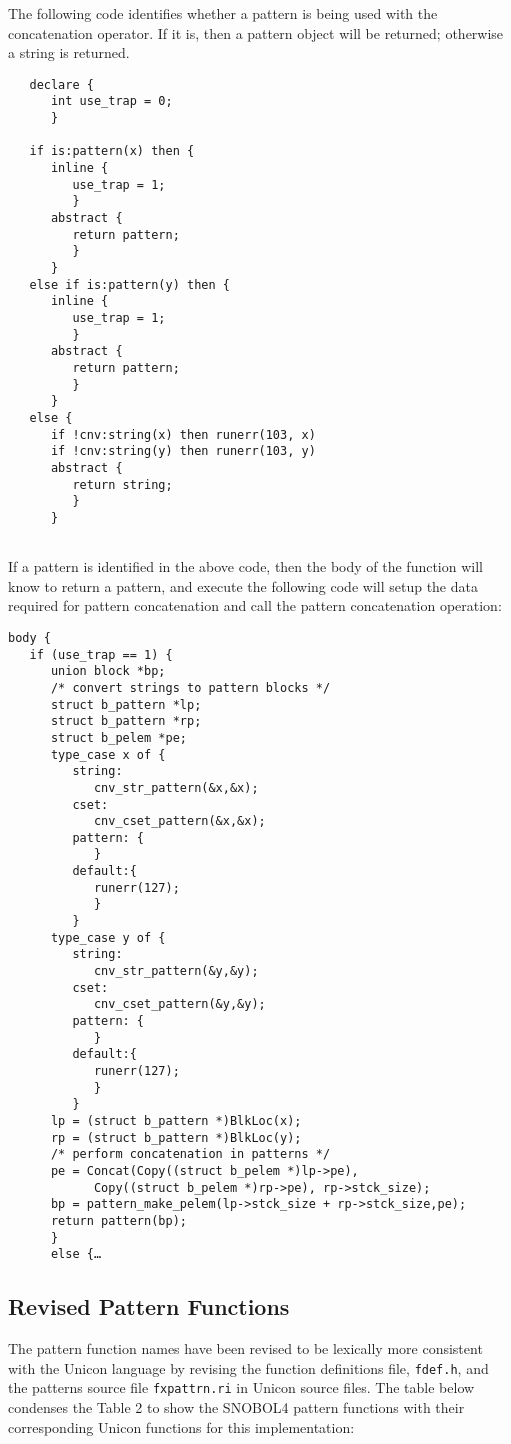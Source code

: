 \documentclass{article}
\begin{document}
The following code identifies whether a pattern is being used with the concatenation operator.  If it is, then a pattern object will be returned; otherwise a string is returned.
\begin{verbatim}
   declare {
      int use_trap = 0;
      }

   if is:pattern(x) then {
      inline {
         use_trap = 1;
         }
      abstract {
         return pattern;
         }
      }
   else if is:pattern(y) then {
      inline {
         use_trap = 1;
         }
      abstract {
         return pattern;
         }
      }
   else {
      if !cnv:string(x) then runerr(103, x)
      if !cnv:string(y) then runerr(103, y)
      abstract {
         return string;
         }
      }
      
\end{verbatim}
If a pattern is identified in the above code, then the body of the function will know to return a pattern, and execute the following code will setup the data required for pattern concatenation and call the pattern concatenation operation:
\begin{verbatim}
body {
   if (use_trap == 1) {
      union block *bp;
      /* convert strings to pattern blocks */
      struct b_pattern *lp;
      struct b_pattern *rp;
      struct b_pelem *pe;
      type_case x of {
         string:
            cnv_str_pattern(&x,&x);
         cset:
            cnv_cset_pattern(&x,&x);
         pattern: {
            }
         default:{
            runerr(127);
            }
         }
      type_case y of {
         string:
            cnv_str_pattern(&y,&y);
         cset:
			cnv_cset_pattern(&y,&y);
         pattern: {
            }
         default:{
            runerr(127);
            }
         }
      lp = (struct b_pattern *)BlkLoc(x);
      rp = (struct b_pattern *)BlkLoc(y);
      /* perform concatenation in patterns */
      pe = Concat(Copy((struct b_pelem *)lp->pe), 
            Copy((struct b_pelem *)rp->pe), rp->stck_size);
      bp = pattern_make_pelem(lp->stck_size + rp->stck_size,pe);
      return pattern(bp);
      }
      else {…
\end{verbatim}

\subsection{Revised Pattern Functions}
The pattern function names have been revised to be lexically more consistent with the Unicon language by revising the function definitions file, \texttt{fdef.h}, and the patterns source file \texttt{fxpattrn.ri} in Unicon source files.  The table below condenses the Table 2 to show the SNOBOL4 pattern functions with their corresponding Unicon functions for this implementation:  
\end{document}
